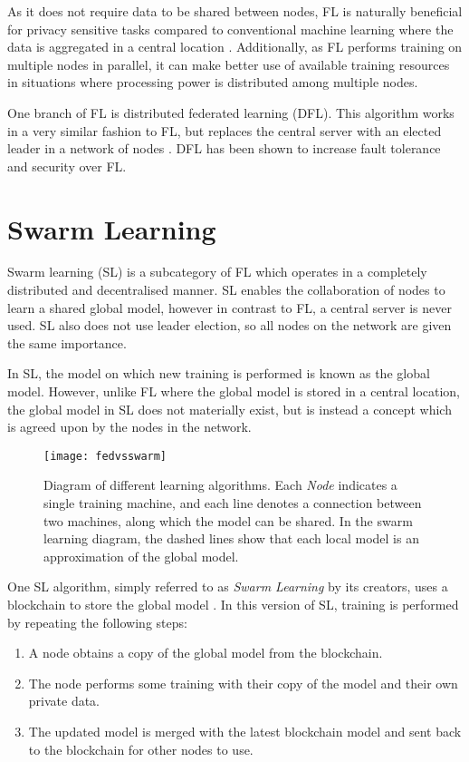As it does not require data to be shared between nodes, FL is naturally beneficial for privacy sensitive tasks compared to conventional machine learning where the data is aggregated in a central location \cite{fed_privacy}. Additionally, as FL performs training on multiple nodes in parallel, it can make better use of available training resources in situations where processing power is distributed among multiple nodes.

One branch of FL is distributed federated learning (DFL). This algorithm works in a very similar fashion to FL, but replaces the central server with an elected leader in a network of nodes \cite{leaderelec_car}. DFL has been shown to increase fault tolerance and security over FL.


\section{Swarm Learning}
Swarm learning (SL) is a subcategory of FL which operates in a completely distributed and decentralised manner. SL enables the collaboration of nodes to learn a shared global model, however in contrast to FL, a central server is never used. SL also does not use leader election, so all nodes on the network are given the same importance.

In SL, the model on which new training is performed is known as the global model. However, unlike FL where the global model is stored in a central location, the global model in SL does not materially exist, but is instead a concept which is agreed upon by the nodes in the network.

\begin{figure}[h]
	\texttt{[image: fedvsswarm]}
	\caption{Diagram of different learning algorithms. Each \emph{Node} indicates a single training machine, and each line denotes a connection between two machines, along which the model can be shared. In the swarm learning diagram, the dashed lines show that each local model is an approximation of the global model.} \label{fig_learning}
\end{figure}

One SL algorithm, simply referred to as \emph{Swarm Learning} by its creators, uses a blockchain to store the global model \cite{swarm_learning}. In this version of SL, training is performed by repeating the following steps:
\begin{enumerate}
	\item A node obtains a copy of the global model from the blockchain.
	\item The node performs some training with their copy of the model and their own private data.
	\item The updated model is merged with the latest blockchain model and sent back to the blockchain for other nodes to use.
\end{enumerate}

